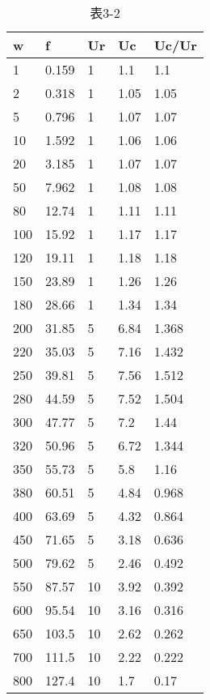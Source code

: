 \documentclass[UTF8,a4paper,10pt]{ctexart}
\begin{document}
	\begin{table}[h]
		\caption{表3-2}
		\centering
		\begin{tabular}{|l|l|l|l|l|}
			\hline
			w   & f     & Ur & Uc   & Uc/Ur \\ \hline
			1   & 0.159 & 1  & 1.1  & 1.1   \\ \hline
			2   & 0.318 & 1  & 1.05 & 1.05  \\ \hline
			5   & 0.796 & 1  & 1.07 & 1.07  \\ \hline
			10  & 1.592 & 1  & 1.06 & 1.06  \\ \hline
			20  & 3.185 & 1  & 1.07 & 1.07  \\ \hline
			50  & 7.962 & 1  & 1.08 & 1.08  \\ \hline
			80  & 12.74 & 1  & 1.11 & 1.11  \\ \hline
			100 & 15.92 & 1  & 1.17 & 1.17  \\ \hline
			120 & 19.11 & 1  & 1.18 & 1.18  \\ \hline
			150 & 23.89 & 1  & 1.26 & 1.26  \\ \hline
			180 & 28.66 & 1  & 1.34 & 1.34  \\ \hline
			200 & 31.85 & 5  & 6.84 & 1.368 \\ \hline
			220 & 35.03 & 5  & 7.16 & 1.432 \\ \hline
			250 & 39.81 & 5  & 7.56 & 1.512 \\ \hline
			280 & 44.59 & 5  & 7.52 & 1.504 \\ \hline
			300 & 47.77 & 5  & 7.2  & 1.44  \\ \hline
			320 & 50.96 & 5  & 6.72 & 1.344 \\ \hline
			350 & 55.73 & 5  & 5.8  & 1.16  \\ \hline
			380 & 60.51 & 5  & 4.84 & 0.968 \\ \hline
			400 & 63.69 & 5  & 4.32 & 0.864 \\ \hline
			450 & 71.65 & 5  & 3.18 & 0.636 \\ \hline
			500 & 79.62 & 5  & 2.46 & 0.492 \\ \hline
			550 & 87.57 & 10 & 3.92 & 0.392 \\ \hline
			600 & 95.54 & 10 & 3.16 & 0.316 \\ \hline
			650 & 103.5 & 10 & 2.62 & 0.262 \\ \hline
			700 & 111.5 & 10 & 2.22 & 0.222 \\ \hline
			800 & 127.4 & 10 & 1.7  & 0.17  \\ \hline
		\end{tabular}
	\end{table}
\end{document}
